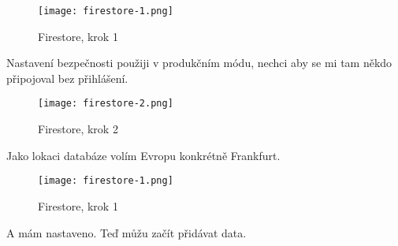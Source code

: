 \begin{figure}[H]
    \centering
    \texttt{[image: firestore-1.png]}
    \caption{Firestore, krok 1}
\end{figure}
Nastavení bezpečnosti použiji v produkčním módu, nechci aby se mi tam někdo připojoval bez přihlášení.
\begin{figure}[H]
    \centering
    \texttt{[image: firestore-2.png]}
    \caption{Firestore, krok 2}
\end{figure}
Jako lokaci databáze volím Evropu konkrétně Frankfurt.
\begin{figure}[H]
    \centering
    \texttt{[image: firestore-1.png]}
    \caption{Firestore, krok 1}
\end{figure}
A mám nastaveno. Teď můžu začít přidávat data.
